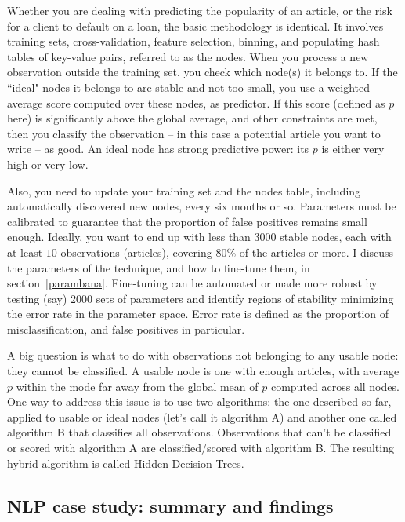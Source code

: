 \documentclass[oneside,10pt]{book}
\begin{document}
Whether you are dealing with predicting the popularity of an article, or the risk for a client to default on a loan, the basic methodology is identical. It involves training sets, \textcolor{index}{cross-validation}, \textcolor{index}{feature selection}, \textcolor{index}{binning}, and populating hash tables of key-value pairs, referred to as the nodes.
When you process a new observation outside the training set, you check which node(s) it belongs to. If the ``ideal" nodes it belongs to are stable and not too small, you use a weighted average score computed over these nodes, as predictor.  If this score (defined as $p$ here) is significantly above the global average, and other constraints are met, then you classify the observation -- in this case a potential article  you want to write -- as good. An ideal node has strong \textcolor{index}{predictive power}: its $p$ is either
  very high or very low.

Also, you need to update your training set and the nodes table, including automatically discovered new nodes, every six months or so.
Parameters must be calibrated to guarantee that the proportion of false positives  remains small enough. Ideally, you want to end up with
 less than $\num{3000}$ stable nodes, each with at least $10$ observations (articles), covering $80\%$ of the articles or more. 
I discuss the parameters of the technique, and how to fine-tune them, in section~\ref{parambana}. Fine-tuning can be automated or made more robust by testing (say) 
$\num{2000}$ sets of parameters and identify regions of stability minimizing the error rate in the parameter space.  Error rate is defined as the proportion of misclassification, and false positives in particular.  

A big question is what to do with observations not belonging to any usable node: they cannot be classified. A \textcolor{index}{usable node} is one with enough articles, with average $p$ within the mode far away from the global mean of $p$ computed across all nodes.
One way to address this issue is to use two algorithms: the one described so far, applied to usable or ideal nodes (let's call it algorithm A) and another one called algorithm B that classifies all observations. Observations that can't be classified or scored with algorithm A are classified/scored with algorithm B. 
The resulting hybrid algorithm is called Hidden Decision Trees. 


\subsection{NLP case study: summary and findings}
\end{document}
